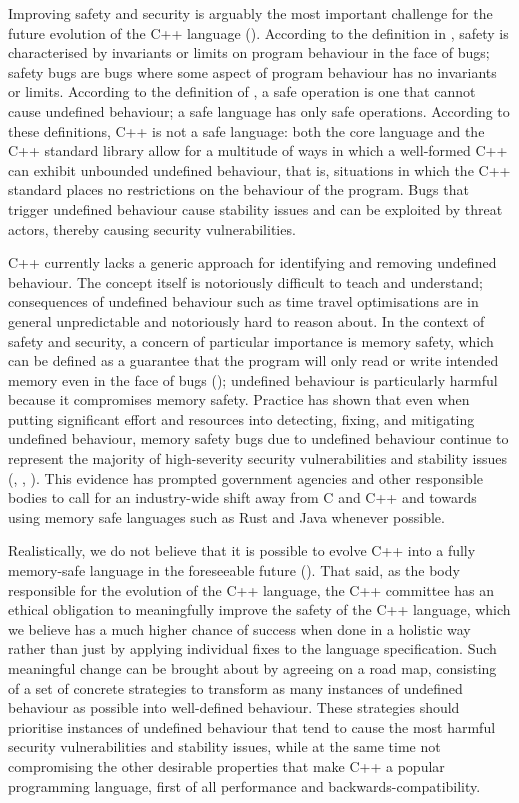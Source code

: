 Improving safety and security is arguably the most important challenge for the future evolution of the C++ language (\cite{Bastien2023}). According to the definition in \cite{Carruth2023}, safety is characterised by invariants or limits on program behaviour in the face of bugs; safety bugs are bugs where some aspect of program behaviour has no invariants or limits. According to the definition of \cite{Abrahams2023}, a safe operation is one that cannot cause undefined behaviour; a safe language has only safe operations. According to these definitions, C++ is not a safe language: both the core language and the C++ standard library allow for a multitude of ways in which a well-formed C++ can exhibit unbounded undefined behaviour, that is, situations in which the C++ standard places no restrictions on the behaviour of the program. Bugs that trigger undefined behaviour cause stability issues and can be exploited by threat actors, thereby causing security vulnerabilities.

C++ currently lacks a generic approach for identifying and removing undefined behaviour. The concept itself is notoriously difficult to teach and understand; consequences of undefined behaviour such as time travel optimisations are in general unpredictable and notoriously hard to reason about. In the context of safety and security, a concern of particular importance is memory safety, which can be defined as a guarantee that the program will only read or write intended memory even in the face of bugs (\cite{Carruth2023}); undefined behaviour is particularly harmful because it compromises memory safety. Practice has shown that even when putting significant effort and resources into detecting, fixing, and mitigating undefined behaviour, memory safety bugs due to undefined behaviour continue to represent the majority of high-severity security vulnerabilities and stability issues (\cite{NSA2022}, \cite{CR2023}, \cite{CISA2023}). This evidence has prompted government agencies and other responsible bodies to call for an industry-wide shift away from C and C++ and towards using memory safe languages such as Rust and Java whenever possible.

Realistically, we do not believe that it is possible to evolve C++ into a fully memory-safe language in the foreseeable future (\cite{Doumler2023}). That said, as the body responsible for the evolution of the C++ language, the C++ committee has an ethical obligation to meaningfully improve the safety of the C++ language, which we believe has a much higher chance of success when done in a holistic way rather than just by applying individual fixes to the language specification. Such meaningful change can be brought about by agreeing on a road map, consisting of a set of concrete strategies to transform as many instances of undefined behaviour as possible into well-defined behaviour. These strategies should prioritise instances of undefined behaviour that tend to cause the most harmful security vulnerabilities and stability issues, while at the same time not compromising the other desirable properties that make C++ a popular programming language, first of all performance and backwards-compatibility.

